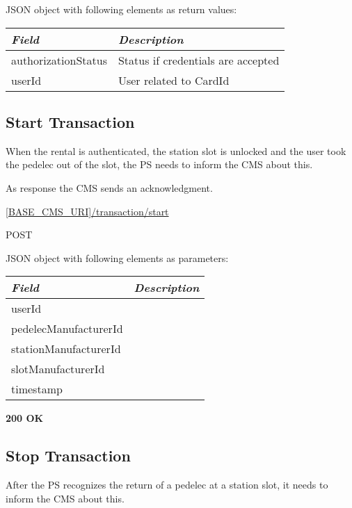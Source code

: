 JSON object with following elements as return values:\\
\begin{tabularx}{\linewidth}{ | l | X | }
  \hline
  \textit{Field} & \textit{Description} \\
  \hline \hline
  authorizationStatus 		& Status if credentials are accepted \\
  userId						& User related to CardId \\
    \hline
\end{tabularx}


\subsection{Start Transaction}

When the rental is authenticated, the station slot is unlocked and the user took the pedelec out of the slot, the \acs{PS} needs to inform the \acs{CMS} about this.

As response the \acs{CMS} sends an acknowledgment.

 \url{[BASE_CMS_URI]/transaction/start}

 POST

JSON object with following elements as parameters:\\
\begin{tabularx}{\linewidth}{ | l | X | }
  \hline
  \textit{Field} & \textit{Description} \\
  \hline \hline
  	userId 		& \\
  	pedelecManufacturerId			& \\
  	stationManufacturerId			& \\
  	slotManufacturerId			& \\
  	timestamp					& \\
  	
    \hline
\end{tabularx}

\textbf{200 OK}\\


\subsection{Stop Transaction}

After the \acs{PS} recognizes the return of a pedelec at a station slot, it needs to inform the \acs{CMS} about this.

